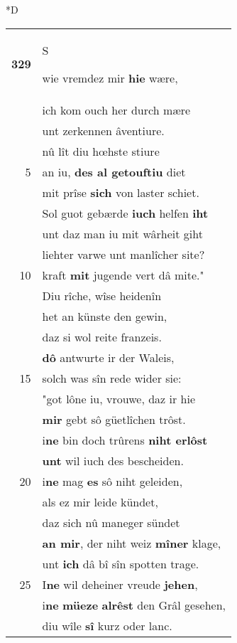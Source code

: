 \documentclass[8pt,a4paper,notitlepage]{article}
\begin{document}
\begin{table}[ht]
\begin{minipage}[t]{0.5\linewidth}
\small
\begin{center}*D
\end{center}
\begin{tabular}{rl}
\textbf{329} & \begin{large}S\end{large}wie vremdez mir \textbf{hie} wære,\\ 
 & ich kom ouch her durch mære\\ 
 & unt zerkennen âventiure.\\ 
 & nû lît diu hœhste stiure\\ 
5 & an iu, \textbf{des al getouftiu} diet\\ 
 & mit prîse \textbf{sich} von laster schiet.\\ 
 & Sol guot gebærde \textbf{iuch} helfen \textbf{iht}\\ 
 & unt daz man iu mit wârheit giht\\ 
 & liehter varwe unt manlîcher site?\\ 
10 & kraft \textbf{mit} jugende vert dâ mite."\\ 
 & Diu rîche, wîse heidenîn\\ 
 & het an künste den gewin,\\ 
 & daz si wol reite franzeis.\\ 
 & \textbf{dô} antwurte ir der Waleis,\\ 
15 & solch was sîn rede wider sie:\\ 
 & "got lône iu, vrouwe, daz ir hie\\ 
 & \textbf{mir} gebt sô güetlîchen trôst.\\ 
 & i\textbf{ne} bin doch trûrens \textbf{niht erlôst}\\ 
 & \textbf{unt} wil iuch des bescheiden.\\ 
20 & i\textbf{ne} mag \textbf{es} sô niht geleiden,\\ 
 & als ez mir leide kündet,\\ 
 & daz sich nû maneger sündet\\ 
 & \textbf{an mir}, der niht weiz \textbf{mîner} klage,\\ 
 & unt \textbf{ich} dâ bî sîn spotten trage.\\ 
25 & I\textbf{ne} wil deheiner vreude \textbf{jehen},\\ 
 & i\textbf{ne} \textbf{müeze} \textbf{alrêst} den Grâl gesehen,\\ 
 & diu wîle \textbf{sî} kurz oder lanc.\\ 

\end{tabular}
\end{minipage}
\end{table}
\end{document}
